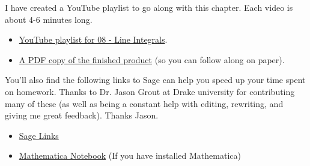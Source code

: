 I have created a YouTube playlist to go along with this chapter. Each video is about 4-6 minutes long.
\begin{itemize}
 \item \href{http://www.youtube.com/playlist?list=PL04DF68E73B7ECD54}{YouTube playlist for 08 - Line Integrals}.
 \item \href{http://db.tt/dAFBcMB7}{A PDF copy of the finished product} (so you can follow along on paper).
\end{itemize}
You'll also find the following links to Sage can help you speed up your time spent on homework. Thanks to Dr. Jason Grout at Drake university for contributing many of these (as well as being a constant help with editing, rewriting, and giving me great feedback).  Thanks Jason. 
\begin{itemize}
 \item \href{http://bmw.byuimath.com/dokuwiki/doku.php?id=sage_links}{Sage Links}
 \item \href{https://content.byui.edu/file/3e8d885f-db47-4e74-9e04-c3d72627c835/1/_zips/215-Tech-Introduction.zip}{Mathematica Notebook} (If you have installed Mathematica)
\end{itemize}




